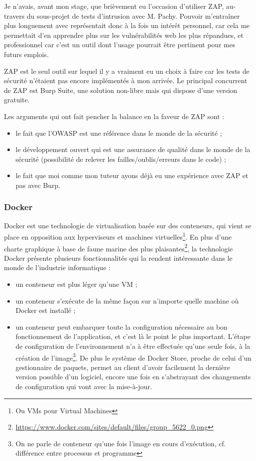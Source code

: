 Je n'avais, avant mon stage, que brièvement eu l'occasion d'utiliser ZAP, au-travers du sous-projet de tests d'intrusion avec M. Pachy. Pouvoir m'entraîner plus longuement avec représentait donc à la fois un intérêt personnel, car cela me permettait d'en apprendre plus sur les vulnérabilités web les plus répandues, et professionnel car c'est un outil dont l'usage pourrait être pertinent pour mes futurs emplois.

ZAP est le seul outil sur lequel il y a vraiment eu un choix à faire car les tests de sécurité n'étaient pas encore implémentés à mon arrivée. Le principal concurrent de ZAP est Burp Suite\cite{burp}, une solution non-libre mais qui dispose d'une version gratuite.

Les arguments qui ont fait pencher la balance en la faveur de ZAP sont :
\begin{itemize}[label=$\bullet$]
	\item le fait que l'OWASP est une référence dans le monde de la sécurité ;
	\item le développement ouvert qui est une assurance de qualité dans le monde de la sécurité (possibilité de relever les failles/oublis/erreurs dans le code) ;
	\item le fait que moi comme mon tuteur ayons déjà eu une expérience avec ZAP et pas avec Burp.
\end{itemize}

\subsubsection{Docker}
Docker\cite{docker} est une technologie de virtualisation basée sur des conteneurs, qui vient se place en opposition aux hyperviseurs et machines virtuelles\footnote{Ou VMs pour Virtual Machines}. En plus d'une charte graphique à base de faune marine des plus plaisantes\footnote{\url{https://www.docker.com/sites/default/files/group_5622_0.png}}, la technologie Docker présente plusieurs fonctionnalités qui la rendent intéressante dans le monde de l'industrie informatique :
\begin{itemize}[label=$\bullet$]
	\item un conteneur est plus léger qu'une VM ;
	\item un conteneur s'exécute de la même façon sur n'importe quelle machine où Docker est installé ;
	\item un conteneur peut embarquer toute la configuration nécessaire au bon fonctionnement de l'application, et c'est là le point le plus important. L'étape de configuration de l'environnement n'a à être effectuée qu'une seule fois, à la création de l'image\footnote{On ne parle de conteneur qu'une fois l'image en cours d'exécution, cf. différence entre processus et programme}. De plus le système de Docker Store\cite{docker_store}, proche de celui d'un gestionnaire de paquets, permet au client d'avoir facilement la dernière version possible d'un logiciel, encore une fois en s'abstrayant des changements de configuration qui vont avec la mise-à-jour.
\end{itemize}

